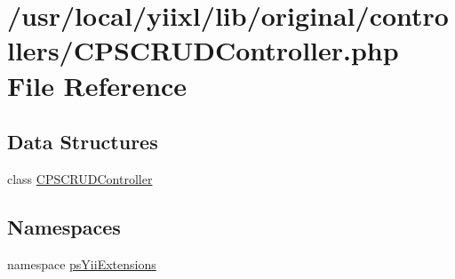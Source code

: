\hypertarget{CPSCRUDController_8php}{
\section{/usr/local/yiixl/lib/original/controllers/CPSCRUDController.php File Reference}
\label{CPSCRUDController_8php}
}
\subsection*{Data Structures}
\begin{DoxyCompactItemize}
\item 
class \hyperlink{classCPSCRUDController}{CPSCRUDController}
\end{DoxyCompactItemize}
\subsection*{Namespaces}
\begin{DoxyCompactItemize}
\item 
namespace \hyperlink{namespacepsYiiExtensions}{psYiiExtensions}
\end{DoxyCompactItemize}
